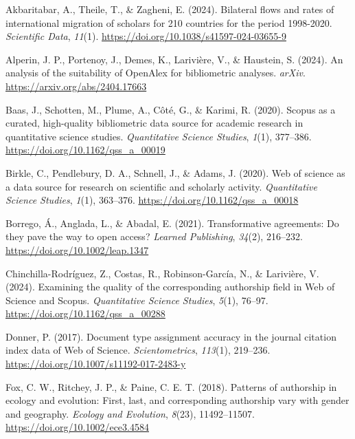 \documentclass[a4paper,man,floatsintext,longtable,noextraspace,10pt]{apa6}
\newlength{\cslhangindent}
\newenvironment{CSLReferences}[2] %
{\begin{list}{}{%
  \setlength{\itemindent}{0pt}
  \setlength{\leftmargin}{0pt}
  \setlength{\parsep}{0pt}
  \ifodd #1
  \setlength{\leftmargin}{\cslhangindent}
  \setlength{\itemindent}{-1\cslhangindent}
  \fi
  \setlength{\itemsep}{#2\baselineskip}}}
{\end{list}}
\begin{document}
\label{refs}
\begin{CSLReferences}{1}{0}
Akbaritabar, A., Theile, T., \& Zagheni, E. (2024). Bilateral flows and
rates of international migration of scholars for 210 countries for the
period 1998-2020. \emph{Scientific Data}, \emph{11}(1).
\url{https://doi.org/10.1038/s41597-024-03655-9}

Alperin, J. P., Portenoy, J., Demes, K., Larivière, V., \& Haustein, S.
(2024). An analysis of the suitability of OpenAlex for bibliometric
analyses. \emph{arXiv}. \url{https://arxiv.org/abs/2404.17663}

Baas, J., Schotten, M., Plume, A., Côté, G., \& Karimi, R. (2020).
Scopus as a curated, high-quality bibliometric data source for academic
research in quantitative science studies. \emph{Quantitative Science
Studies}, \emph{1}(1), 377--386.
\url{https://doi.org/10.1162/qss_a_00019}

Birkle, C., Pendlebury, D. A., Schnell, J., \& Adams, J. (2020). Web of
science as a data source for research on scientific and scholarly
activity. \emph{Quantitative Science Studies}, \emph{1}(1), 363--376.
\url{https://doi.org/10.1162/qss_a_00018}

Borrego, Á., Anglada, L., \& Abadal, E. (2021). Transformative
agreements: Do they pave the way to open access? \emph{Learned
Publishing}, \emph{34}(2), 216--232.
\url{https://doi.org/10.1002/leap.1347}

Chinchilla-Rodríguez, Z., Costas, R., Robinson-García, N., \& Larivière,
V. (2024). Examining the quality of the corresponding authorship field
in {Web of Science} and {Scopus}. \emph{Quantitative Science Studies},
\emph{5}(1), 76--97. \url{https://doi.org/10.1162/qss_a_00288}

Donner, P. (2017). Document type assignment accuracy in the journal
citation index data of {Web of Science}. \emph{Scientometrics},
\emph{113}(1), 219--236. \url{https://doi.org/10.1007/s11192-017-2483-y}

Fox, C. W., Ritchey, J. P., \& Paine, C. E. T. (2018). Patterns of
authorship in ecology and evolution: First, last, and corresponding
authorship vary with gender and geography. \emph{Ecology and Evolution},
\emph{8}(23), 11492--11507. \url{https://doi.org/10.1002/ece3.4584}


\end{CSLReferences}
\end{document}
